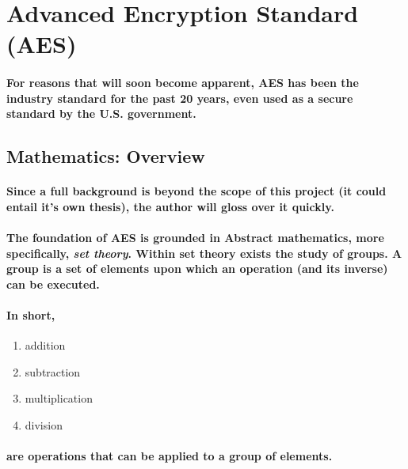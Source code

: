 \section{Advanced Encryption Standard (AES)}

\paragraph{For reasons that will soon become apparent, AES has been the industry standard for the past 20 years, even used as a secure standard by the U.S. government.} \cite [p. 107]{Aumasson}


\subsection{Mathematics: Overview}
\paragraph{Since a full background is beyond the scope of this project (it could entail it's own thesis), the author will gloss over it quickly.}

\paragraph{The foundation of AES is grounded in Abstract mathematics, more specifically, \emph{set theory}. Within set theory exists the study of groups. A group is a set of elements upon which an operation (and its inverse) can be executed.}\cite[p. 92]{PaarPelzl} 

\paragraph{In short,}

\begin{enumerate}
\item addition
\item subtraction
\item multiplication
\item division
\end{enumerate}

\paragraph{are operations that can be applied to a group of elements.}

